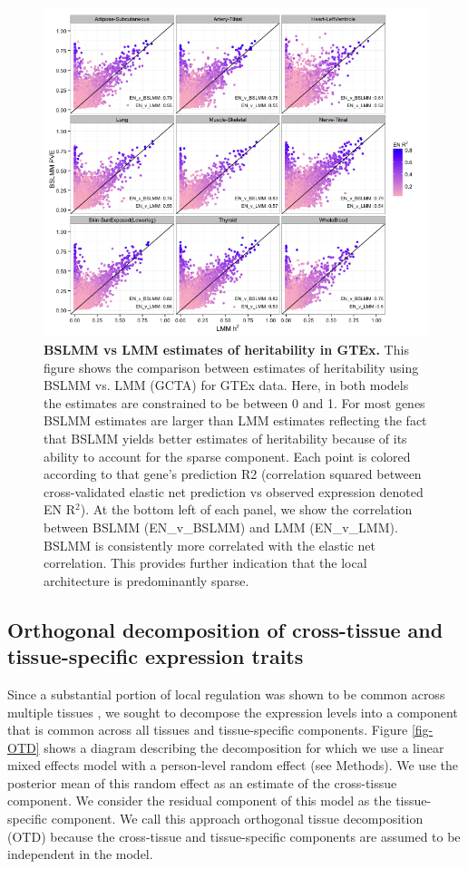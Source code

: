 \documentclass[10pt,letterpaper]{article}
\begin{document}
\begin{figure}[H]
\includegraphics[width=12cm]{Figures/Fig-GTEx_TW_PVE_v_h2.png}
\caption{{\bf BSLMM vs LMM estimates of heritability in GTEx.} 
This figure shows the comparison between estimates of heritability using BSLMM vs. LMM (GCTA) for GTEx data. Here, in both models the estimates are constrained to be between 0 and 1. For most genes BSLMM estimates are larger than LMM estimates reflecting the fact that BSLMM yields better estimates of heritability because of its ability to account for the sparse component. Each point is colored according to that gene's prediction R2 (correlation squared between cross-validated elastic net prediction vs observed expression denoted EN R$^2$). At the bottom left of each panel, we show the correlation between BSLMM (EN\_v\_BSLMM) and LMM (EN\_v\_LMM). BSLMM is consistently more correlated with the elastic net correlation. This provides further indication that the local architecture is predominantly sparse.}
\label{fig-gtex-pve-h2}
\end{figure}

\subsection*{Orthogonal decomposition 	of cross-tissue and tissue-specific expression traits}

Since a substantial portion of local regulation was shown to be common across multiple tissues \cite{Ardlie_2015}, we sought to decompose the expression levels into a component that is common across all tissues and tissue-specific components. Figure \ref{fig-OTD} shows a diagram describing the decomposition for which we use a linear mixed effects model with a person-level random effect (see Methods). We use the posterior mean of this random effect as an estimate of the cross-tissue component. We consider the residual component of this model as the tissue-specific component. We call this approach orthogonal tissue decomposition (OTD) because the cross-tissue and tissue-specific components are assumed to be independent in the model. 
\end{document}
